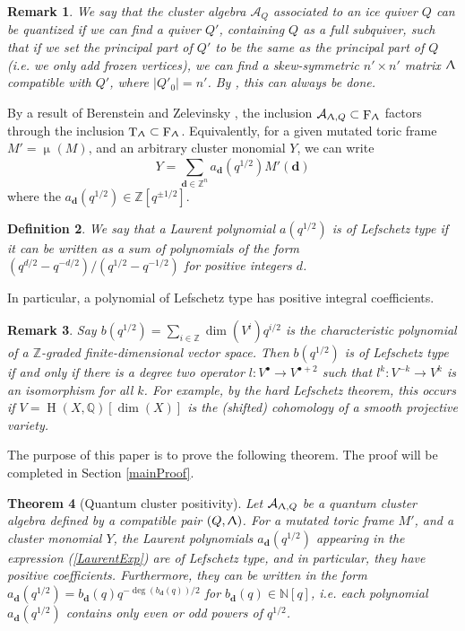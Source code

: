 \documentclass[a4paper,10pt]{amsart}
\newtheorem{theorem}{Theorem}[section]
\newtheorem{definition}[theorem]{Definition}
\newtheorem{remark}[theorem]{Remark}
\newcommand{\dd}{\mathbf{d}}
\renewcommand{\Lambda}{\Uplambda}
\renewcommand{\mu}{\upmu}
\DeclareMathOperator{\Tor}{T}
\DeclareMathOperator{\For}{F}
\DeclareMathOperator{\Ss}{\overline{s}}
\DeclareMathOperator{\HO}{H}
\begin{document}
\begin{remark}
\label{quantization}
We say that the cluster algebra $\mathcal{A}_Q$ associated to an ice quiver $Q$ can be \textit{quantized} if we can find a quiver $Q'$, containing $Q$ as a full subquiver, such that if we set the principal part of $Q'$ to be the same as the principal part of $Q$ (i.e. we only add frozen vertices), we can find a skew-symmetric $n'\times n'$ matrix $\Lambda$ compatible with $Q'$, where $|Q'_0|=n'$.  By \cite[Lem.4.4]{DMSS13}, this can always be done.
\end{remark}
By a result of Berenstein and Zelevinsky \cite[Cor.5.2]{BZ05}, the inclusion $\mathcal{A}_{\Lambda,Q}\subset\For_{\Lambda}$ factors through the inclusion $\Tor_{\Lambda}\subset \For_{\Lambda}$.  Equivalently, for a given mutated toric frame $M'=\mu_{\Ss}(M)$, and an arbitrary cluster monomial $Y$, we can write
\begin{equation}
\label{LaurentExp}
Y=\sum_{\dd\in \mathbb{Z}^n}a_\dd(q^{1/2})M'(\dd)
\end{equation}
where the $a_\dd(q^{1/2})\in\mathbb{Z}[q^{\pm 1/2}]$.
\begin{definition}
\label{LefDef}
We say that a Laurent polynomial $a(q^{1/2})$ is of \textit{Lefschetz type} if it can be written as a sum of polynomials of the form $(q^{d/2}-q^{-d/2})/(q^{1/2}-q^{-1/2})$ for positive integers $d$.
\end{definition}
In particular, a polynomial of Lefschetz type has positive integral coefficients.
\begin{remark}
Say $b(q^{1/2})=\sum_{i\in \mathbb{Z}}\dim(V^i)q^{i/2}$ is the characteristic polynomial of a $\mathbb{Z}$-graded finite-dimensional vector space.  Then $b(q^{1/2})$ is of Lefschetz type if and only if there is a degree two operator $l\colon V^{\bullet}\rightarrow V^{\bullet+2}$ such that $l^k\colon V^{-k}\rightarrow V^k$ is an isomorphism for all $k$.  For example, by the hard Lefschetz theorem, this occurs if $V=\HO(X,\mathbb{Q})[\dim(X)]$ is the (shifted) cohomology of a smooth projective variety.
\end{remark}
The purpose of this paper is to prove the following theorem.  The proof will be completed in Section \ref{mainProof}.
\begin{theorem}[Quantum cluster positivity]
\label{mainThm}
Let $\mathcal{A}_{\Lambda,Q}$ be a quantum cluster algebra defined by a compatible pair $(Q,\Lambda)$.  For a mutated toric frame $M'$, and a cluster monomial $Y$, the Laurent polynomials $a_\dd(q^{1/2})$ appearing in the expression (\ref{LaurentExp}) are of Lefschetz type, and in particular, they have positive coefficients.  Furthermore, they can be written in the form $a_{\dd}(q^{1/2})=b_{\dd}(q)q^{-\deg(b_{\dd}(q))/2}$ for $b_{\dd}(q)\in\mathbb{N}[q]$, i.e. each polynomial $a_{\dd}(q^{1/2})$ contains only even or odd powers of $q^{1/2}$.
\end{theorem}
\end{document}
